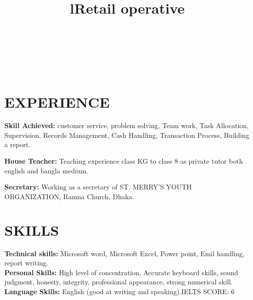 \documentclass[margin]{res}
\begin{document}
\begin{resume}


\begin{format}
\title{l}\\
\\
\body\\
\end{format}

\section{EXPERIENCE}

\title{\textbf{Retail operative }}
\begin{position}
\textbf{Skill Achieved:}
customer service, problem solving, Team work, Task Allocation, Supervision, Records Management, Cash Handling, Transaction Process, Building a report.
\end{position}

\textbf{House Teacher:} Teaching experience class KG to class 8 as private tutor both english and bangla medium.

\textbf{Secretary:}  Working as a secretary of ST. MERRY'S YOUTH ORGANIZATION, Ramna
Church, Dhaka.
\section{SKILLS}

\textbf{Technical skills:} Microsoft word, Microsoft Excel, Power point, Emil handling, report writing.
\\
\textbf{Personal Skills:} High level of concentration, Accurate keyboard skills, sound judgment, honesty, integrity, professional appearance, strong numerical skill.
\\
\textbf{Language Skills:} English (good at writing and speaking).IELTS SCORE: 6



\end{resume}
\end{document}

